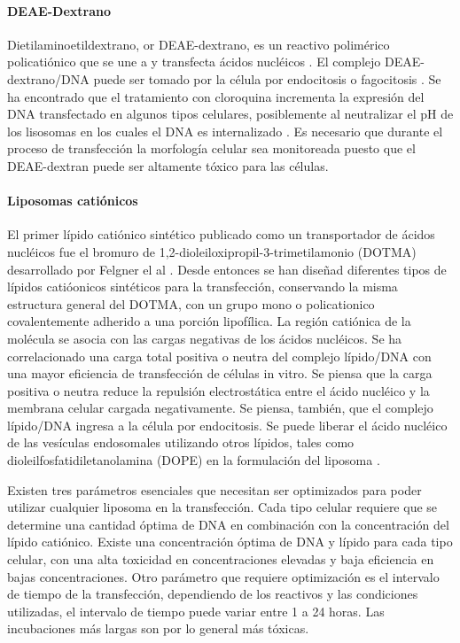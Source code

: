 \documentclass[fleqn,10pt]{SelfArx} %
\begin{document}
\paragraph*{DEAE-Dextrano}
Dietilaminoetildextrano, or DEAE-dextrano, es un reactivo polimérico policatiónico que se une a y transfecta ácidos nucléicos \cite{McCutchan:1968aa}.  El complejo DEAE-dextrano/DNA puede ser tomado por la célula por endocitosis o fagocitosis \cite{Yang:1997aa, Luthman:1983aa}. Se ha encontrado que el tratamiento con cloroquina incrementa la expresión del DNA transfectado en algunos tipos celulares, posiblemente al neutralizar el pH de los lisosomas en los cuales el DNA es internalizado \cite{Luthman:1983aa}. Es necesario que durante el proceso de transfección la morfología celular sea monitoreada puesto que el DEAE-dextran puede ser altamente tóxico para las células.

\paragraph*{Liposomas catiónicos}
El primer lípido catiónico sintético publicado como un transportador de ácidos nucléicos fue el bromuro de 1,2-dioleiloxipropil-3-trimetilamonio (DOTMA) desarrollado por Felgner el al \cite{Felgner01111987}. Desde entonces se han diseñad diferentes tipos de lípidos catióonicos sintéticos para la transfección, conservando la misma estructura general del DOTMA, con un grupo mono o policationico covalentemente adherido a una porción lipofílica. La región catiónica de la molécula se asocia con las cargas negativas de los ácidos nucléicos. Se ha correlacionado una carga total positiva o neutra del complejo lípido/DNA con una mayor eficiencia de transfección de células in vitro. Se piensa que la carga positiva o neutra reduce la repulsión electrostática entre el ácido nucléico y la membrana celular cargada negativamente. Se piensa, también, que el complejo lípido/DNA ingresa a la célula por endocitosis.  Se puede liberar el ácido nucléico de las vesículas endosomales utilizando otros lípidos, tales como dioleilfosfatidiletanolamina (DOPE) en la formulación del liposoma \cite{Farhood:1995aa}. 

Existen tres parámetros esenciales que necesitan ser optimizados para poder utilizar cualquier liposoma en la transfección. Cada tipo celular requiere que se determine una cantidad óptima de DNA en combinación con la concentración del lípido catiónico. Existe una concentración óptima de DNA y lípido para cada tipo celular, con una alta toxicidad en concentraciones elevadas y baja eficiencia en bajas concentraciones. Otro parámetro que requiere optimización es el intervalo de tiempo de la transfección, dependiendo de los reactivos y las condiciones utilizadas, el intervalo de tiempo puede variar entre 1 a 24 horas. Las incubaciones más largas son por lo general más tóxicas.
\end{document}
